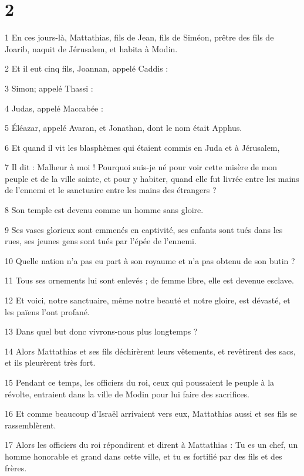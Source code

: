 \chapter{2}

\par 1 En ces jours-là, Mattathias, fils de Jean, fils de Siméon, prêtre des fils de Joarib, naquit de Jérusalem, et habita à Modin.
\par 2 Et il eut cinq fils, Joannan, appelé Caddis :
\par 3 Simon; appelé Thassi :
\par 4 Judas, appelé Maccabée :
\par 5 Éléazar, appelé Avaran, et Jonathan, dont le nom était Apphus.
\par 6 Et quand il vit les blasphèmes qui étaient commis en Juda et à Jérusalem,
\par 7 Il dit : Malheur à moi ! Pourquoi suis-je né pour voir cette misère de mon peuple et de la ville sainte, et pour y habiter, quand elle fut livrée entre les mains de l'ennemi et le sanctuaire entre les mains des étrangers ?
\par 8 Son temple est devenu comme un homme sans gloire.
\par 9 Ses vases glorieux sont emmenés en captivité, ses enfants sont tués dans les rues, ses jeunes gens sont tués par l'épée de l'ennemi.
\par 10 Quelle nation n'a pas eu part à son royaume et n'a pas obtenu de son butin ?
\par 11 Tous ses ornements lui sont enlevés ; de femme libre, elle est devenue esclave.
\par 12 Et voici, notre sanctuaire, même notre beauté et notre gloire, est dévasté, et les païens l'ont profané.
\par 13 Dans quel but donc vivrons-nous plus longtemps ?
\par 14 Alors Mattathias et ses fils déchirèrent leurs vêtements, et revêtirent des sacs, et ils pleurèrent très fort.
\par 15 Pendant ce temps, les officiers du roi, ceux qui poussaient le peuple à la révolte, entraient dans la ville de Modin pour lui faire des sacrifices.
\par 16 Et comme beaucoup d'Israël arrivaient vers eux, Mattathias aussi et ses fils se rassemblèrent.
\par 17 Alors les officiers du roi répondirent et dirent à Mattathias : Tu es un chef, un homme honorable et grand dans cette ville, et tu es fortifié par des fils et des frères.
